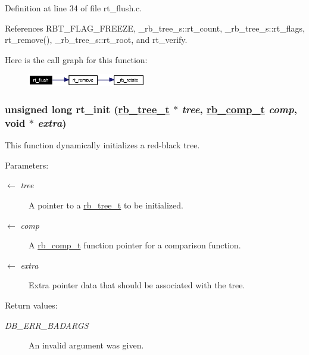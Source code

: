 Definition at line 34 of file rt\_\-flush.c.

References RBT\_\-FLAG\_\-FREEZE, \_\-rb\_\-tree\_\-s::rt\_\-count, \_\-rb\_\-tree\_\-s::rt\_\-flags, rt\_\-remove(), \_\-rb\_\-tree\_\-s::rt\_\-root, and rt\_\-verify.

Here is the call graph for this function:\begin{figure}[H]
\begin{center}
\leavevmode
\includegraphics[width=146pt]{group__dbprim__rbtree_ga13_cgraph}
\end{center}
\end{figure}
\hypertarget{group__dbprim__rbtree_ga6}{
\subsubsection[rt\_\-init]{\setlength{\rightskip}{0pt plus 5cm}unsigned long rt\_\-init (\hyperlink{struct__rb__tree__s}{rb\_\-tree\_\-t} $\ast$ {\em tree}, \hyperlink{group__dbprim__rbtree_ga3}{rb\_\-comp\_\-t} {\em comp}, void $\ast$ {\em extra})}}
\label{group__dbprim__rbtree_ga6}


This function dynamically initializes a red-black tree.

\begin{Desc}
\item[Parameters:]
\begin{description}
\item[\mbox{$\leftarrow$} {\em tree}]A pointer to a \hyperlink{group__dbprim__rbtree_ga0}{rb\_\-tree\_\-t} to be initialized. \item[\mbox{$\leftarrow$} {\em comp}]A \hyperlink{group__dbprim__rbtree_ga3}{rb\_\-comp\_\-t} function pointer for a comparison function. \item[\mbox{$\leftarrow$} {\em extra}]Extra pointer data that should be associated with the tree.\end{description}
\end{Desc}
\begin{Desc}
\item[Return values:]
\begin{description}
\item[{\em DB\_\-ERR\_\-BADARGS}]An invalid argument was given.\end{description}
\end{Desc}


